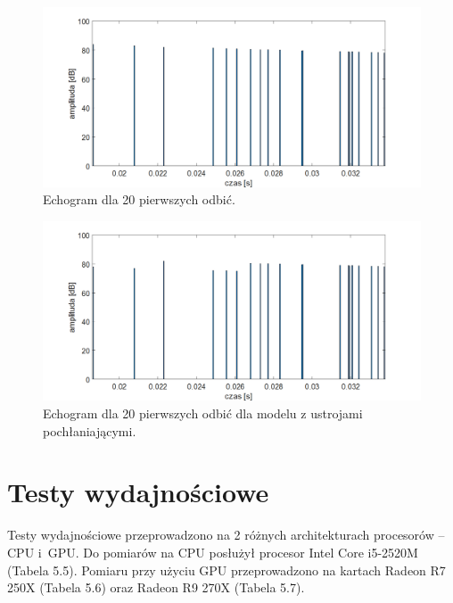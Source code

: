 \begin{figure}[h]
        \centering
                \centering
                \includegraphics[width=16cm]{echogramodbicia}
	\caption{Echogram dla 20 pierwszych odbić.}
\end{figure}

\begin{figure}[h]
        \centering
                \centering
                \includegraphics[width=16cm]{echogramodbiciazpoch}
	\caption{Echogram dla 20 pierwszych odbić dla modelu z ustrojami pochłaniającymi.}
\end{figure}


\section{Testy wydajnościowe}\label{sec:asdas2d}

Testy wydajnościowe przeprowadzono na 2 różnych architekturach procesorów – CPU i~GPU. Do pomiarów na CPU posłużył procesor Intel Core i5-2520M (Tabela 5.5). Pomiaru przy użyciu GPU przeprowadzono na kartach Radeon R7 250X (Tabela 5.6) oraz Radeon R9 270X (Tabela 5.7).
 

